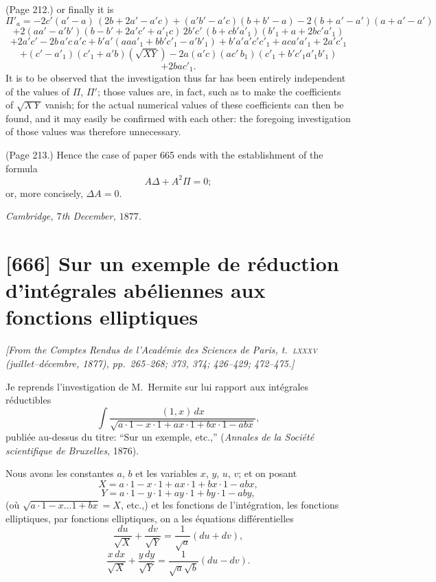 \documentclass[11pt,a4paper]{book}
\begin{document}
\medskip

\noindent (Page 212.) or finally it is
\[
\Pi'_a = - 2 c' (a' - a)\,(2 b + 2 a' - a' c) + (a' b' - a' c)(b + b' - a) - 2(b + a' - a')(a + a' - a')
\]
\[
+ 2 (a a' - a' b')(b - b' + 2 a' c' + a'_1 c)\,2 b' c'\,(b + c b' a'_1)(b'_1 + a + 2 b c' a'_1)
\]
\[
+ 2 a' c' - 2 b\,a' c\,a' c + b' a' (a a a'_1 + b b' c'_1 - a' b'_1) + b' a' a' c' c'_1 + a c a' a'_1 + 2 a' c'_1
\]
\[
+ (c' - a'_1)(c'_1 + a' b)(\sqrt{X Y}) - 2 a (a' c)(a c'\,b_1)(c'_1 + b' c'_1 a'_1 b'_1)
\]
\[
+ 2 b a c'_1.
\]
It is to be observed that the investigation thus far has been entirely independent of the values of $\Pi$, $\Pi'$; those values are, in fact, such as to make the coefficients of $\sqrt{X\,Y}$ vanish; for the actual numerical values of these coefficients can then be found, and it may easily be confirmed with each other: the foregoing investigation of those values was therefore unnecessary.

\medskip

\noindent (Page 213.) Hence the case of paper 665 ends with the establishment of the formula
\[
A \Delta + A^2 \Pi = 0;
\]
or, more concisely, $\Delta A = 0$.

\bigskip

\noindent\textit{Cambridge, $7$th December, $1877$.}

\bigskip

\section{[666] Sur un exemple de r\'eduction d'int\'egrales ab\'eliennes aux fonctions elliptiques}
\label{sec:666}

\noindent\textit{[From the \emph{Comptes Rendus de l'Acad\'emie des Sciences de Paris}, t.~\textsc{lxxxv} (juillet--d\'ecembre, 1877), pp.~265--268; 373, 374; 426--429; 472--475.]}

\medskip

\noindent Je reprends l'investigation de M.~Hermite sur lui rapport aux int\'egrales r\'eductibles
\[
\int \frac{(1, x)\,dx}{\sqrt{a\cdot 1 - x \cdot 1 + ax\cdot 1 + bx\cdot 1 - abx}},
\]
publi\'ee au-dessus du titre: ``Sur un exemple, etc.,'' (\emph{Annales de la Soci\'et\'e scientifique de Bruxelles}, 1876).

Nous avons les constantes $a$, $b$ et les variables $x$, $y$, $u$, $v$; et on posant
\[
X = a\cdot 1 - x\cdot 1 + a x\cdot 1 + b x\cdot 1 - a b x,
\]
\[
Y = a\cdot 1 - y\cdot 1 + a y\cdot 1 + b y\cdot 1 - a b y,
\]
(o\`u $\sqrt{a\cdot 1 - x \ldots 1 + bx} = X$, etc.,) et les fonctions de l'int\'egration, les fonctions elliptiques, par fonctions elliptiques, on a les \'equations diff\'erentielles
\[
\frac{du}{\sqrt{X}} + \frac{dv}{\sqrt{Y}} = \frac{1}{\sqrt{a}} (du + dv),
\]
\[
\frac{x\,dx}{\sqrt{X}} + \frac{y\,dy}{\sqrt{Y}} = \frac{1}{\sqrt{a}\sqrt{b}} (du - dv).
\]
\end{document}
